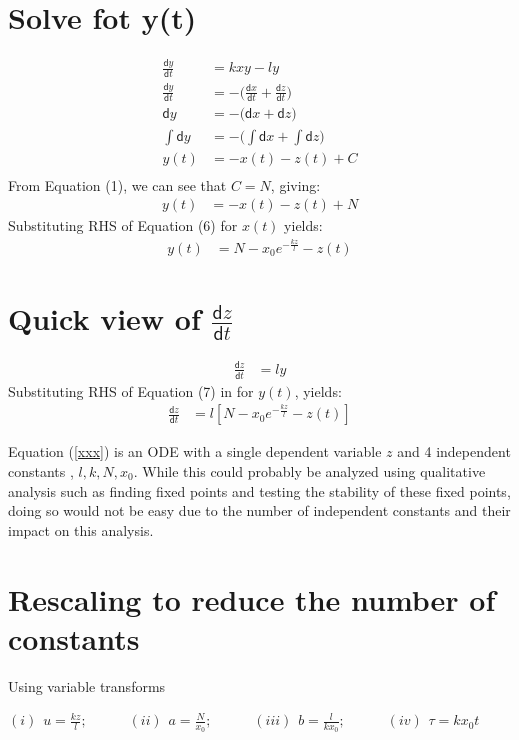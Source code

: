 \documentclass[a4paper]{article}
\begin{document}
\section{Solve fot y(t)}

\begin{align*}
  \frac{\mathsf{d}y}{\mathsf{d}t} &= kxy - ly						\\
  \frac{\mathsf{d}y}{\mathsf{d}t} &= - \bigg(\frac{\mathsf{d}x}{\mathsf{d}t} + \frac{\mathsf{d}z}{\mathsf{d}t}\bigg)	  	\\
  \mathsf{d}y &= - \bigg(\mathsf{d}x + \mathsf{d}z\bigg)	  					\\
  \int{\mathsf{d}y} &= - \bigg(\int{\mathsf{d}x} + \int{\mathsf{d}z}\bigg)	  			\\
  y(t) &= - x(t) - z(t) + C						\\
\end{align*}
From Equation (1), we can see that $C = N$, giving:
\begin{align*}
  y(t) &= - x(t) - z(t) + N						
\end{align*}
Substituting RHS of Equation (6) for $x(t)$ yields: 
\begin{align}
  y(t) &= N - x_{0}e^{-\frac{kz}{l}} - z(t)
\end{align}

\section{Quick view of $\frac{\mathsf{d}z}{\mathsf{d}t}$}
\begin{align*}
  \frac{\mathsf{d}z}{\mathsf{d}t} &= ly			
\end{align*}
Substituting RHS of Equation (7) in for $y(t)$, yields:
\begin{align}
    \label{xxx}
    \frac{\mathsf{d}z}{\mathsf{d}t} &= l[N - x_{0}e^{-\frac{kz}{l}} - z(t)]			
\end{align}

Equation (\ref{xxx}) is an ODE with a single dependent variable $z$ and 4 independent constants , $l, k, N, x_{0}$. While this could probably be analyzed using qualitative analysis such as finding fixed points and testing the stability
of these fixed points, doing so would not be easy due to the number of independent constants and their impact on this analysis.

\section{Rescaling to reduce the number of constants}
Using variable transforms
\begin{center}
  $(i) \hspace{5pt} u = \frac{kz}{l};  \hspace{35pt} (ii) \hspace{5pt} a = \frac{N}{x_{0}};  \hspace{35pt} (iii) \hspace{5pt} b = \frac{l}{kx_{0}}; \hspace{35pt} (iv) \hspace{5pt} \tau = kx_{0}t$
\end{center}
\end{document}
